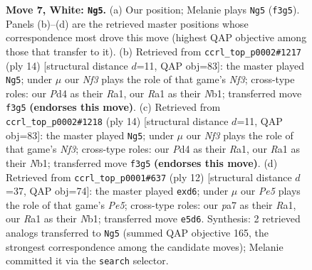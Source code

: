 \documentclass[11pt]{article}
\begin{document}
\begin{figure}[p]
\caption{\textbf{Move 7, White: \texttt{Ng5}.} (a) Our position; Melanie plays \texttt{Ng5} (\texttt{f3g5}). Panels (b)--(d) are the retrieved master positions whose correspondence most drove this move (highest QAP objective among those that transfer to it). (b) Retrieved from \texttt{ccrl\_top\_p0002\#1217} (ply 14) [structural distance $d$=11, QAP obj=83]: the master played \texttt{Ng5}; under $\mu$ our \emph{Nf3} plays the role of that game's \emph{Nf3}; cross-type roles: our \emph{P}d4 as their \emph{R}a1, our \emph{R}a1 as their \emph{N}b1; transferred move \texttt{f3g5} \textbf{(endorses this move)}. (c) Retrieved from \texttt{ccrl\_top\_p0002\#1218} (ply 14) [structural distance $d$=11, QAP obj=83]: the master played \texttt{Ng5}; under $\mu$ our \emph{Nf3} plays the role of that game's \emph{Nf3}; cross-type roles: our \emph{P}d4 as their \emph{R}a1, our \emph{R}a1 as their \emph{N}b1; transferred move \texttt{f3g5} \textbf{(endorses this move)}. (d) Retrieved from \texttt{ccrl\_top\_p0001\#637} (ply 12) [structural distance $d$=37, QAP obj=74]: the master played \texttt{exd6}; under $\mu$ our \emph{Pe5} plays the role of that game's \emph{Pe5}; cross-type roles: our \emph{p}a7 as their \emph{R}a1, our \emph{R}a1 as their \emph{N}b1; transferred move \texttt{e5d6}. Synthesis: 2 retrieved analogs transferred to \texttt{Ng5} (summed QAP objective 165, the strongest correspondence among the candidate moves); Melanie committed it via the \texttt{search} selector.}
\label{fig:thought-m12}
\end{figure}

\clearpage
\end{document}
